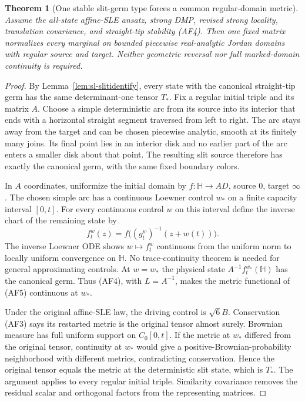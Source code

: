 \documentclass[11pt]{article}
\newtheorem{theorem}{Theorem}[section]
\theoremstyle{definition}\newtheorem{definition}[theorem]{Definition}
\theoremstyle{remark}\newtheorem{remark}[theorem]{Remark}
\begin{document}
\begin{theorem}[One stable slit-germ type forces a common regular-domain metric]
\label{thm:sl-onegerm}
Assume the all-state affine-SLE ansatz, strong DMP, revised strong locality,
translation covariance, and straight-tip stability (AF4). Then one fixed
matrix normalizes every marginal on bounded piecewise real-analytic Jordan
domains with regular source and target. Neither geometric reversal nor full
marked-domain continuity is required.
\end{theorem}
\begin{proof}
By Lemma~\ref{lem:sl-slitidentify}, every state with the canonical straight-tip
germ has the same determinant-one tensor $T_*$.
Fix a regular initial triple and its matrix $A$. Choose a simple deterministic
arc from its source into its interior that ends with a horizontal straight
segment traversed from left to right. The arc stays away from the target and
can be chosen piecewise analytic, smooth at its finitely many joins. Its final
point lies in an interior disk and no earlier part of the arc enters a smaller
disk about that point. The resulting slit source therefore has exactly the
canonical germ, with the same fixed boundary colors.

In $A$ coordinates, uniformize the initial domain by
$f:\mathbb H\to AD$, source $0$, target $\infty$. The chosen simple arc has
a continuous Loewner control $w_*$ on a finite capacity interval $[0,t]$.
For every continuous control $w$ on this interval define the inverse chart of
the remaining state by
\[
 f_t^w(z)=f\bigl((g_t^w)^{-1}(z+w(t))\bigr).
 \tag{AF5}
\]
The inverse Loewner ODE shows $w\mapsto f_t^w$ continuous from the uniform
norm to locally uniform convergence on $\mathbb H$. No trace-continuity
theorem is needed for general approximating controls. At $w=w_*$ the physical
state $A^{-1}f_t^{w_*}(\mathbb H)$ has the canonical germ.
Thus (AF4), with $L=A^{-1}$, makes the metric functional of (AF5) continuous
at $w_*$.

Under the original affine-SLE law, the driving control is $\sqrt6B$.
Conservation (AF3) says its restarted metric is the original tensor almost
surely. Brownian measure has full uniform support on $C_0[0,t]$.
If the metric at $w_*$ differed from the original tensor, continuity at $w_*$
would give a positive-Brownian-probability neighborhood with different
metrics, contradicting conservation. Hence the original tensor equals the
metric at the deterministic slit state, which is $T_*$. The argument applies
to every regular initial triple. Similarity covariance removes the residual
scalar and orthogonal factors from the representing matrices.
\end{proof}
\end{document}
